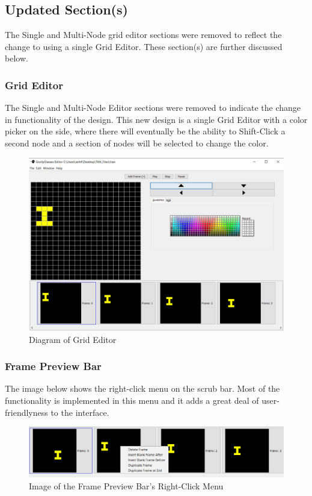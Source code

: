 \documentclass[12pt]{article}
\begin{document}
\begin{appendices}
      \subsection{Updated Section(s)}
        The Single and Multi-Node grid editor sections were removed to reflect the change to using a single Grid Editor. These section(s) are further discussed below.
      
        \subsubsection {Grid Editor}
          The Single and Multi-Node Editor sections were removed to indicate the change in functionality of the design. This new design is a single Grid Editor with a color picker on the side, where there will eventually be the ability to Shift-Click a second node and a section of nodes will be selected to change the color.
      
        \begin{figure}[ht!]
          \centering
          \includegraphics[width=.6\linewidth]{gridEditor.PNG}
          \caption{Diagram of Grid Editor}
        \end{figure}
      
      
        \subsubsection {Frame Preview Bar}
          The image below shows the right-click menu on the scrub bar. Most of the functionality is implemented in this menu and it adds a great deal of user-friendlyness to the interface.
        
        \begin{figure}[ht!]
          \centering
          \includegraphics[width=.8\linewidth]{rtClick.PNG}
          \caption{Image of the Frame Preview Bar's Right-Click Menu}
        \end{figure}
      

\end{appendices}
\end{document}
